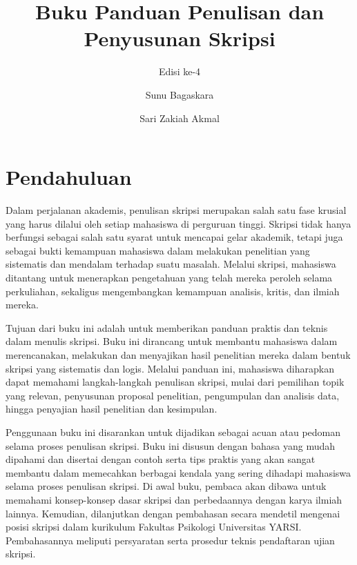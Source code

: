 \documentclass[
  indonesian,
  letterpaper,
]{scrbook}
\title{Buku Panduan Penulisan dan Penyusunan Skripsi}
\subtitle{Edisi ke-4}
\author{Sunu Bagaskara \and Sari Zakiah Akmal}
\date{}
\renewcommand*\contentsname{Daftar Isi}
\newcommand\contentsname{Daftar Isi}
\begin{document}
\frontmatter
\maketitle

\renewcommand*\contentsname{Daftar Isi}
{
\setcounter{tocdepth}{1}
\tableofcontents
}

\mainmatter
{}

\chapter*{\texorpdfstring{\textbf{Pendahuluan}}{Pendahuluan}}\label{pendahuluan}


Dalam perjalanan akademis, penulisan skripsi merupakan salah satu fase
krusial yang harus dilalui oleh setiap mahasiswa di perguruan tinggi.
Skripsi tidak hanya berfungsi sebagai salah satu syarat untuk mencapai
gelar akademik, tetapi juga sebagai bukti kemampuan mahasiswa dalam
melakukan penelitian yang sistematis dan mendalam terhadap suatu
masalah. Melalui skripsi, mahasiswa ditantang untuk menerapkan
pengetahuan yang telah mereka peroleh selama perkuliahan, sekaligus
mengembangkan kemampuan analisis, kritis, dan ilmiah mereka.

Tujuan dari buku ini adalah untuk memberikan panduan praktis dan teknis
dalam menulis skripsi. Buku ini dirancang untuk membantu mahasiswa dalam
merencanakan, melakukan dan menyajikan hasil penelitian mereka dalam
bentuk skripsi yang sistematis dan logis. Melalui panduan ini, mahasiswa
diharapkan dapat memahami langkah-langkah penulisan skripsi, mulai dari
pemilihan topik yang relevan, penyusunan proposal penelitian,
pengumpulan dan analisis data, hingga penyajian hasil penelitian dan
kesimpulan.

Penggunaan buku ini disarankan untuk dijadikan sebagai acuan atau
pedoman selama proses penulisan skripsi. Buku ini disusun dengan bahasa
yang mudah dipahami dan disertai dengan contoh serta tips praktis yang
akan sangat membantu dalam memecahkan berbagai kendala yang sering
dihadapi mahasiswa selama proses penulisan skripsi. Di awal buku,
pembaca akan dibawa untuk memahami konsep-konsep dasar skripsi dan
perbedaannya dengan karya ilmiah lainnya. Kemudian, dilanjutkan dengan
pembahasan secara mendetil mengenai posisi skripsi dalam kurikulum
Fakultas Psikologi Universitas YARSI. Pembahasannya meliputi persyaratan
serta prosedur teknis pendaftaran ujian skripsi.
\end{document}
